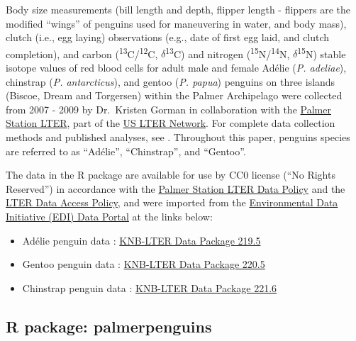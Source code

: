 Body size measurements (bill length and depth, flipper length - flippers
are the modified ``wings'' of penguins used for maneuvering in water,
and body mass), clutch (i.e., egg laying) observations (e.g., date of
first egg laid, and clutch completion), and carbon
(\textsuperscript{13}C/\textsuperscript{12}C,
\(\delta\)\textsuperscript{13}C) and nitrogen
(\textsuperscript{15}N/\textsuperscript{14}N,
\(\delta\)\textsuperscript{15}N) stable isotope values of red blood
cells for adult male and female Adélie (\emph{P. adeliae}), chinstrap
(\emph{P. antarcticus}), and gentoo (\emph{P. papua}) penguins on three
islands (Biscoe, Dream and Torgersen) within the Palmer Archipelago were
collected from 2007 - 2009 by Dr.~Kristen Gorman in collaboration with
the \href{https://pal.lternet.edu/}{Palmer Station LTER}, part of the
\href{https://lternet.edu/}{US LTER Network}. For complete data
collection methods and published analyses, see
\citet{gorman_ecological_2014}. Throughout this paper, penguins species
are referred to as ``Adélie'', ``Chinstrap'', and ``Gentoo''.

The data in the  R package are available for use
by CC0 license (``No Rights Reserved'') in accordance with the
\href{https://pal.lternet.edu/data/policies}{Palmer Station LTER Data
Policy} and the \href{https://lternet.edu/data-access-policy/}{LTER Data
Access Policy}, and were imported from the
\href{https://environmentaldatainitiative.org/}{Environmental Data
Initiative (EDI) Data Portal} at the links below:

\begin{itemize}
\tightlist
\item
  Adélie penguin data
  \citep{palmer_station_antarctica_lter_structural_2020}:
  \href{https://portal.edirepository.org/nis/mapbrowse?packageid=knb-lter-pal.219.5}{KNB-LTER
  Data Package 219.5}
\item
  Gentoo penguin data
  \citep{palmer_station_antarctica_lter_structural_2020-1}:
  \href{https://portal.edirepository.org/nis/mapbrowse?packageid=knb-lter-pal.220.5}{KNB-LTER
  Data Package 220.5}
\item
  Chinstrap penguin data
  \citep{palmer_station_antarctica_lter_structural_2020-2}:
  \href{https://portal.edirepository.org/nis/mapbrowse?packageid=knb-lter-pal.221.6}{KNB-LTER
  Data Package 221.6}
\end{itemize}

\hypertarget{r-package-palmerpenguins}{%
\subsection{R package: palmerpenguins}\label{r-package-palmerpenguins}}

